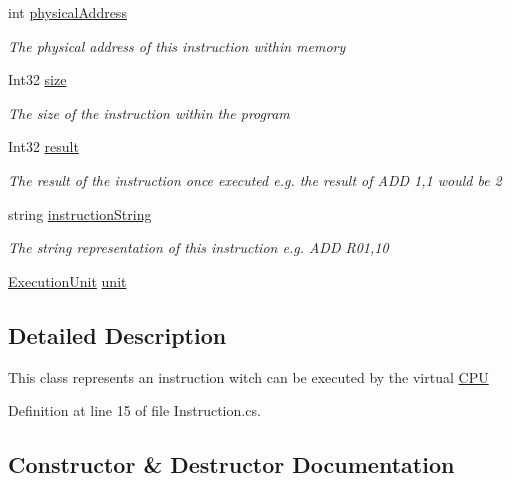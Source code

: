 \begin{DoxyCompactItemize}
int \hyperlink{class_c_p_u___o_s___simulator_1_1_c_p_u_1_1_instruction_a401c8f3740b63632e17db6f80b505a17}{physical\+Address}
\begin{DoxyCompactList}\small\item\em The physical address of this instruction within memory \end{DoxyCompactList}\item 
Int32 \hyperlink{class_c_p_u___o_s___simulator_1_1_c_p_u_1_1_instruction_ac8c820f3e522e4fefaa510856ed11fb0}{size}
\begin{DoxyCompactList}\small\item\em The size of the instruction within the program \end{DoxyCompactList}\item 
Int32 \hyperlink{class_c_p_u___o_s___simulator_1_1_c_p_u_1_1_instruction_a8fb993dcebcd127a335a7d068a6e9de4}{result}
\begin{DoxyCompactList}\small\item\em The result of the instruction once executed e.\+g. the result of A\+D\+D 1,1 would be 2 \end{DoxyCompactList}\item 
string \hyperlink{class_c_p_u___o_s___simulator_1_1_c_p_u_1_1_instruction_ab58373ca153de047b36c1036e07db7a8}{instruction\+String}
\begin{DoxyCompactList}\small\item\em The string representation of this instruction e.\+g. A\+D\+D R01,10 \end{DoxyCompactList}\item 
\hyperlink{class_c_p_u___o_s___simulator_1_1_c_p_u_1_1_execution_unit}{Execution\+Unit} \hyperlink{class_c_p_u___o_s___simulator_1_1_c_p_u_1_1_instruction_a0337c93fbfb5993eab37f1d052ca5f43}{unit}
\end{DoxyCompactItemize}


\subsection{Detailed Description}
This class represents an instruction witch can be executed by the virtual \hyperlink{namespace_c_p_u___o_s___simulator_1_1_c_p_u}{C\+P\+U} 



Definition at line 15 of file Instruction.\+cs.



\subsection{Constructor \& Destructor Documentation}
\hypertarget{class_c_p_u___o_s___simulator_1_1_c_p_u_1_1_instruction_a2038c543e7b47a5997405f56cb8c7aa9}{}
